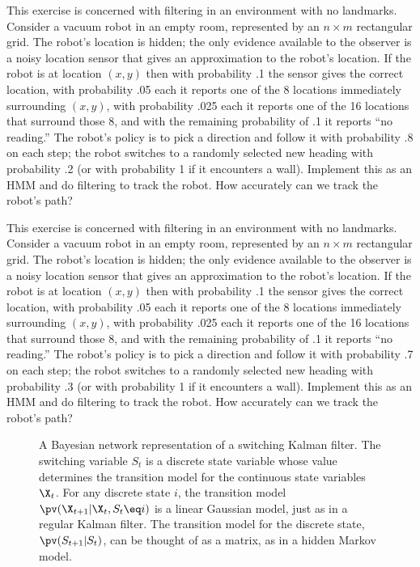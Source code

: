 \begin{uexercise}
This exercise is concerned with filtering in an environment with no
landmarks.  Consider a vacuum robot in an empty room, represented by
an \(n \times m\) rectangular grid.  The robot's location is hidden;
the only evidence available to the observer is a noisy location sensor
that gives an approximation to the robot's location. If the robot is
at location \((x, y)\) then with probability .1 the sensor gives the
correct location, with probability .05 each it reports one of the 8
locations immediately surrounding \((x, y)\), with probability .025
each it reports one of the 16 locations that surround those 8, and
with the remaining probability of .1 it reports ``no reading.''  The
robot's policy is to pick a direction and follow it with probability
.8 on each step; the robot switches to a randomly selected new heading
with probability .2 (or with probability 1 if it encounters a
wall). Implement this as an HMM and do filtering to track the
robot. How accurately can we track the robot's path?
\end{uexercise} 

\begin{iexercise}
This exercise is concerned with filtering in an environment with no
landmarks.  Consider a vacuum robot in an empty room, represented by
an \(n \times m\) rectangular grid.  The robot's location is hidden;
the only evidence available to the observer is a noisy location sensor
that gives an approximation to the robot's location. If the robot is
at location \((x, y)\) then with probability .1 the sensor gives the
correct location, with probability .05 each it reports one of the 8
locations immediately surrounding \((x, y)\), with probability .025
each it reports one of the 16 locations that surround those 8, and
with the remaining probability of .1 it reports ``no reading.''  The
robot's policy is to pick a direction and follow it with probability
.7 on each step; the robot switches to a randomly selected new heading
with probability .3 (or with probability 1 if it encounters a
wall). Implement this as an HMM and do filtering to track the
robot. How accurately can we track the robot's path?
\end{iexercise} 



\begin{figure}[tp]
{}
\caption{A Bayesian network representation of a switching Kalman filter.
The switching variable \(S_t\) is a discrete state variable whose value determines
the transition model for the continuous state variables \(\X_t\).
For any discrete state \(i\), the transition model
\(\pv(\X_{t+1}|\X_t,S_t\eq i)\) is a linear Gaussian model, just as in a
regular Kalman filter. The transition model for the discrete state,
\(\pv(S_{t+1}|S_t)\), can be thought of as a matrix, as in a hidden
Markov model.}
\label{switching-kf-figure}
\end{figure} 

